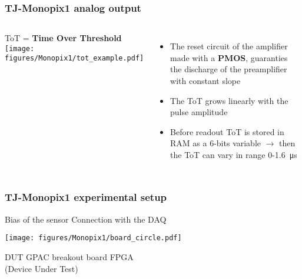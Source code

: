     \begin{frame}
        \frametitle{TJ-Monopix1 analog output}
        \begin{columns}
            ToT = \textbf{Time Over Threshold}\\
            \bigskip
            \hspace*{-0.5cm} 
                \texttt{[image: figures/Monopix1/tot\_example.pdf]}
                \begin{itemize}
                    \item The reset circuit of the amplifier made with a \textbf{PMOS}, guaranties the discharge of the preamplifier with constant slope
                    \item The ToT grows linearly with the pulse amplitude
                    \item Before readout ToT is stored in RAM as a 6-bits variable $\rightarrow$ then the ToT can vary in range 0-\SI{1.6}{\us}
                \end{itemize}
        \end{columns}
    \end{frame} 



    \begin{frame}
        \frametitle{TJ-Monopix1 experimental setup}
            Bias of the sensor\hspace{80pt} Connection with the DAQ
            \begin{center}
                \centering \texttt{[image: figures/Monopix1/board\_circle.pdf]}
            \end{center}
            \hspace{15pt}DUT \hspace{45pt}GPAC breakout board \hspace{25pt} FPGA\\
            \footnotesize(Device Under Test)
    \end{frame} 
 







